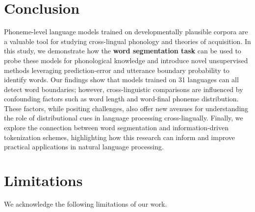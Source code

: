 

\section{Conclusion}

Phoneme-level language models trained on developmentally plausible corpora are a valuable tool for studying cross-lingual phonology and theories of acquisition. In this study, we demonstrate how the \textbf{word segmentation task} can be used to probe these models for phonological knowledge and introduce novel unsupervised methods leveraging prediction-error and utterance boundary probability to identify words. Our findings show that models trained on 31 languages can all detect word boundaries; however, cross-linguistic comparisons are influenced by confounding factors such as word length and word-final phoneme distribution. These factors, while positing challenges, also offer new avenues for understanding the role of distributional cues in language processing cross-lingually. Finally, we explore the connection between word segmentation and information-driven tokenization schemes, highlighting how this research can inform and improve practical applications in natural language processing.

\section{Limitations}\label{app:15-limitations}

We acknowledge the following limitations of our work.

